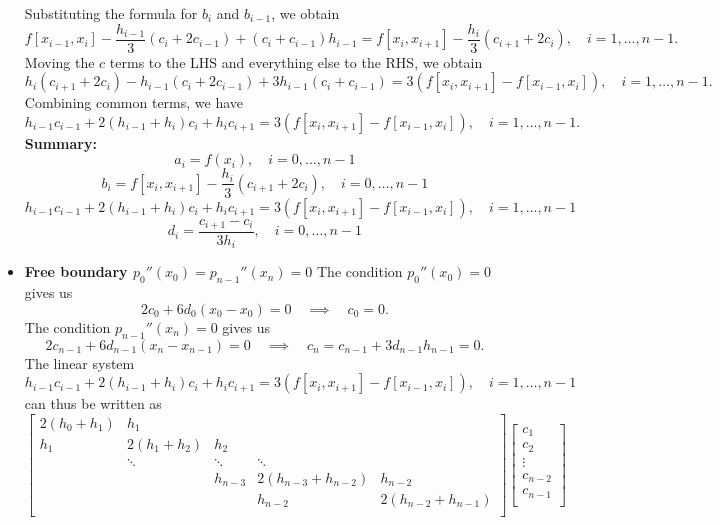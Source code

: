 \documentclass{report}
\begin{document}
\begin{itemize}
            Substituting the formula for $b_i$ and $b_{i-1}$, we obtain
            $$f[x_{i-1},x_{i}] - \frac{h_{i-1}}{3}(c_{i} + 2c_{i-1}) + (c_{i}+c_{i-1}) h_{i-1} = f[x_i,x_{i+1}] - \displaystyle{\frac{h_i}{3}}(c_{i+1} + 2c_i), \quad i=1,\ldots,n-1.$$
            \bigbreak \noindent 
            Moving the $c$ terms to the LHS and everything else to the RHS, we obtain
            $$ h_i(c_{i+1} + 2c_i) - h_{i-1}(c_{i} + 2c_{i-1}) + 3 h_{i-1}(c_{i}+c_{i-1}) = 3\left(f[x_i,x_{i+1}] - f[x_{i-1},x_{i}]\right), \quad i=1,\ldots,n-1.$$
            Combining common terms, we have
            $$h_{i-1}c_{i-1} + 2(h_{i-1} + h_i )c_i + h_i c_{i+1} = 3\left(f[x_i,x_{i+1}] - f[x_{i-1},x_{i}]\right), \quad i=1,\ldots,n-1.$$
            \bigbreak \noindent 
            \textbf{Summary:} 
            $$a_i = f(x_i), \quad i=0,\ldots,n-1$$
            $$b_i = f[x_i,x_{i+1}] - \displaystyle{\frac{h_i}{3}}(c_{i+1} + 2c_i), \quad i=0,\ldots,n-1$$
            $$h_{i-1}c_{i-1} + 2(h_{i-1} + h_i )c_i + h_i c_{i+1} = 3\left(f[x_i,x_{i+1}] - f[x_{i-1},x_{i}]\right), \quad i=1,\ldots,n-1$$
            $$d_i = \displaystyle{\frac{c_{i+1} - c_i}{3 h_i}}, \quad i=0,\ldots,n-1$$
        \item \textbf{Free boundary $p_0''(x_0) = p_{n-1}''(x_n) = 0$}
            \bigbreak \noindent 
            The condition $p_0''(x_0) = 0$ gives us 
            $$2 c_0 + 6 d_0 (x_0 - x_0) = 0 \quad \implies \quad c_0 = 0.$$
            The condition $p_{n-1}''(x_n) = 0$ gives us
            $$2 c_{n-1} + 6 d_{n-1} (x_n - x_{n-1}) = 0 \quad \implies \quad c_n = c_{n-1} + 3d_{n-1} h_{n-1} = 0.$$
            The linear system 
            $$h_{i-1}c_{i-1} + 2(h_{i-1} + h_i )c_i + h_i c_{i+1} = 3\left(f[x_i,x_{i+1}] - f[x_{i-1},x_{i}]\right), \quad i=1,\ldots,n-1$$
            can thus be written as
            $$
            \begin{bmatrix}
                2(h_0 + h_1) & h_1 \\
                h_1 & 2(h_1 + h_2) & h_2 \\
                    &\ddots & \ddots & \ddots \\
                    && h_{n-3} & 2(h_{n-3} + h_{n-2}) & h_{n-2} \\
                    &&& h_{n-2} & 2(h_{n-2} + h_{n-1}) \\
            \end{bmatrix}
            \begin{bmatrix}
                c_1\\c_2\\\vdots\\c_{n-2}\\c_{n-1}\\

\end{bmatrix}$$
\end{itemize}
\end{document}

